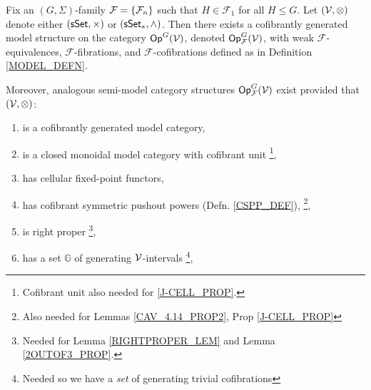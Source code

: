 \documentclass[a4paper,10pt
,draft
]{article}%
\renewcommand{\F}{\mathcal F}
\renewcommand{\1}{\eta}%
\begin{document}
\begin{theorem}
      \label{MODEL_THM}
      Fix an $(G, \Sigma)$-family $\F = \set{\F_n}$ such that $H \in \F_1$ for all $H \leq G$. %
      Let $(\mathcal V, \otimes)$ denote either $(\mathsf{sSet}, \times)$ or $(\sSet_{\**}, \wedge)$.
      Then there exists a cofibrantly generated model structure on the category $\mathsf{Op}^G(\mathcal V)$,
      denoted $\Op^G_\F(\V)$, with
      weak $\F$-equivalences, $\F$-fibrations, and $\F$-cofibrations defined as in Definition \ref{MODEL_DEFN}.
           
      Moreover, analogous semi-model category structures $\Op^G_\F(\V)$ exist
      provided that $(\mathcal V, \otimes)$:
      \begin{enumerate}[label = (\roman*)]\itemsep-4pt
      \item is a cofibrantly generated model category,
      \item is a closed monoidal model category with cofibrant unit
            \footnote{Cofibrant unit also needed for \ref{J-CELL_PROP}.},
      \item has cellular fixed-point functors,
      \item \label{CSPP_LBL} has cofibrant symmetric pushout powers (Defn. \ref{CSPP_DEF}),
            \footnote{Also needed for Lemmas \ref{CAV_4.14_PROP2}, Prop \ref{J-CELL_PROP}}, %
      \item \label{RP_LBL} is right proper
            \footnote{Needed for Lemma \ref{RIGHTPROPER_LEM} and Lemma \ref{2OUTOF3_PROP}.},
      \item \label{GENSET_LBL} has a set $\mathbb{G}$ of generating $\mathcal V$-intervals
            \footnote{Needed so we have a \textit{set} of generating trivial cofibrations},
      \end{enumerate}
\end{theorem}
\end{document}
